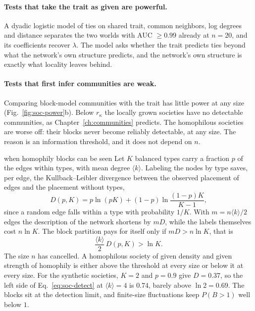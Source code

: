\paragraph{Tests that take the trait as given are powerful.} A dyadic logistic model of
ties on shared trait, common neighbors, log degrees and distance separates the two worlds
with AUC $\ge0.99$ already at $n=20$, and its coefficients recover $\lambda$. The model
asks whether the trait predicts ties beyond what the network's own structure predicts,
and the network's own structure is exactly what locality leaves behind.

\paragraph{Tests that first infer communities are weak.} Comparing block-model
communities with the trait has little power at any size
(Fig.~\ref{fig:soc-power}b). Below $r_\kappa$ the locally grown societies have no
detectable communities, as Chapter~\ref{ch:communities} predicts. The homophilous
societies are worse off: their blocks never become reliably detectable, at any size. The
reason is an information threshold, and it does not depend on $n$.

\begin{calculation}{when homophily blocks can be seen}
Let $K$ balanced types carry a fraction $p$ of the edges within types, with mean degree
$\langle k\rangle$. Labeling the nodes by type saves, per edge, the Kullback--Leibler
divergence between the observed placement of edges and the placement without types,
\begin{equation}
  D(p,K) = p\ln(pK) + (1-p)\ln\frac{(1-p)K}{K-1},
  \label{eq:soc-kl}
\end{equation}
since a random edge falls within a type with probability $1/K$. With $m=n\langle
k\rangle/2$ edges the description of the network shortens by $mD$, while the labels
themselves cost $n\ln K$. The block partition pays for itself only if $mD>n\ln K$, that is
\begin{equation}
  \frac{\langle k\rangle}{2}\,D(p,K) > \ln K .
  \label{eq:soc-detect}
\end{equation}
The size $n$ has cancelled. A homophilous society of given density and given strength of
homophily is either above the threshold at every size or below it at every size. For the
synthetic societies, $K=2$ and $p=0.9$ give $D=0.37$, so the left side of
Eq.~\eqref{eq:soc-detect} at $\langle k\rangle=4$ is $0.74$, barely above $\ln 2=0.69$.
The blocks sit at the detection limit, and finite-size fluctuations keep $P(B>1)$ well
below $1$.
\end{calculation}

